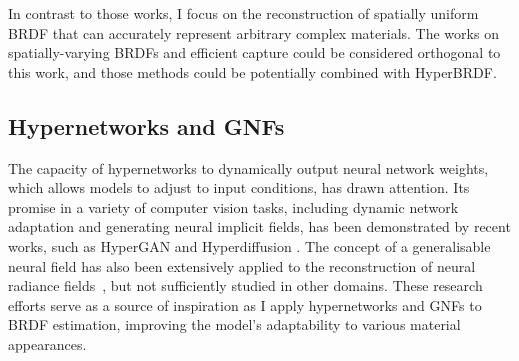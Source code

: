 In contrast to those works, I focus on the reconstruction of spatially uniform \gls{BRDF} that can accurately represent arbitrary complex materials. The works on spatially-varying BRDFs and efficient capture could be considered orthogonal to this work, and those methods could be potentially combined with HyperBRDF. 


\subsection{Hypernetworks and GNFs}
The capacity of hypernetworks to dynamically output neural network weights, which allows models to adjust to input conditions, has drawn attention. Its promise in a variety of computer vision tasks, including dynamic network adaptation and generating neural implicit fields, has been demonstrated by recent works, such as HyperGAN \cite{ratzlaff2019hypergan} and Hyperdiffusion \cite{erkocc2023hyperdiffusion}.
The concept of a generalisable neural field has also been extensively applied to the reconstruction of neural radiance fields~\cite{wang2022attention, yang2023contranerf}, but not sufficiently studied in other domains.
These research efforts serve as a source of inspiration as I apply hypernetworks and \gls{GNF}s to \gls{BRDF} estimation, improving the model's adaptability to various material appearances.

